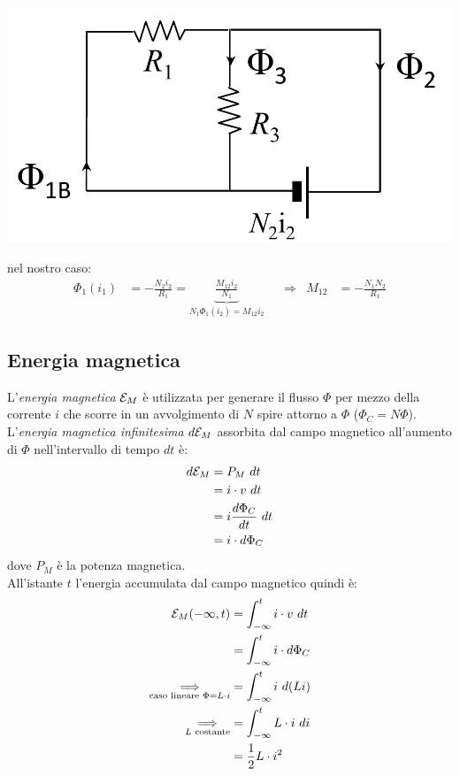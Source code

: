 \documentclass{article}
\begin{document}
\begin{center}
    \includegraphics[scale=0.27]{Image/Analisi_circuito_magnetico_3.png}
\end{center}
nel nostro caso:
\begin{align*}
    \Phi_1(i_1) &= -\frac{N_2i_2}{R_1} = \underbrace{\frac{M_{12}i_2}{N_1}}_{N_1\Phi_1(i_2)=M_{12}i_2}
    &
    &\Longrightarrow
    &
    M_{12} &= -\frac{N_1N_2}{R_1}
\end{align*}



\subsection{Energia magnetica}
L'\textit{energia magnetica} $\mathcal{E}_M$ è utilizzata per generare il flusso $\Phi$ per mezzo della corrente $i$ che scorre in un avvolgimento di $N$ spire attorno a $\Phi$ ($\Phi_C=N\Phi$).\\
L'\textit{energia magnetica infinitesima} $d \mathcal{E}_M$ assorbita dal campo magnetico
all'aumento di $\Phi$ nell'intervallo di tempo $dt$ è:
\begin{align*}
    d \mathcal{E}_M &= P_M \ dt \\
    &=i \cdot v \ dt\\
    &= i \frac{d \Phi_C}{dt} \ dt \\
    &= i \cdot d \Phi_C
\end{align*}
dove $P_M$ è la potenza magnetica.\\
All'istante $t$ l'energia accumulata dal campo magnetico quindi è:
\begin{align*}
    \mathcal{E}_M(- \infty, t) &= \int_{-\infty}^t i \cdot v \ dt \\
    &= \int_{-\infty}^t i \cdot d \Phi_C \\
    \underset{\text{caso lineare }\Phi=L \cdot i}{\Longrightarrow} &= \int_{-\infty}^t i \ d(Li) \\
    \underset{L \text{ costante}}{\Longrightarrow} &= \int_{-\infty}^t L \cdot i \ di \\
    &= \frac{1}{2}L \cdot i^2
\end{align*}
\end{document}
